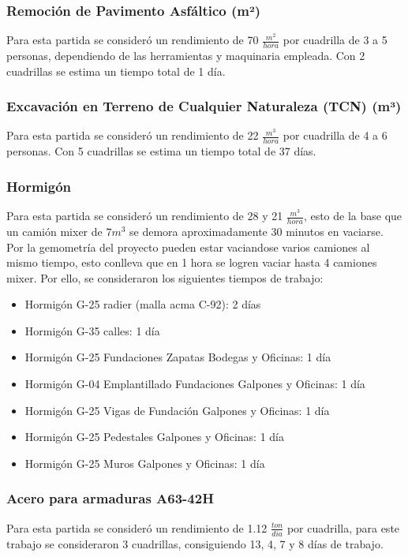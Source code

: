 \documentclass{article} %
\begin{document}
\subsubsection{Remoción de Pavimento Asfáltico (m²)}

Para esta partida se consideró un rendimiento de 70 $\frac{m^2}{hora}$ por cuadrilla de 3 a 5 personas, dependiendo de las herramientas y maquinaria empleada. Con 2 cuadrillas se estima un tiempo total de 1 día.

\subsubsection{Excavación en Terreno de Cualquier Naturaleza (TCN) (m³)}

Para esta partida se consideró un rendimiento de 22 $\frac{m^3}{hora}$ por cuadrilla de 4 a 6 personas. Con 5 cuadrillas se estima un tiempo total de 37 días.

\subsubsection{Hormigón}
Para esta partida se consideró un rendimiento de 28 y 21 $\frac{m^3}{hora}$, esto de la base que un camión mixer de $7m^3$ se demora aproximadamente 30 minutos en vaciarse. Por la gemometría del proyecto pueden estar vaciandose varios camiones al mismo tiempo, esto conlleva que en 1 hora se logren vaciar hasta 4 camiones mixer. Por ello, se consideraron los siguientes tiempos de trabajo:
\begin{itemize}
    \item Hormigón G-25 radier (malla acma C-92): 2 días
    \item Hormigón G-35 calles: 1 día
    \item Hormigón G-25 Fundaciones Zapatas Bodegas y Oficinas: 1 día
    \item Hormigón G-04 Emplantillado Fundaciones Galpones y Oficinas: 1 día
    \item Hormigón G-25 Vigas de Fundación Galpones y Oficinas: 1 día
    \item Hormigón G-25 Pedestales Galpones y Oficinas: 1 día
    \item Hormigón G-25 Muros Galpones y Oficinas: 1 día
\end{itemize}

\subsubsection{Acero para armaduras A63-42H}
Para esta partida se consideró un rendimiento de 1.12 $\frac{ton}{dia}$ por cuadrilla, para este trabajo se consideraron 3 cuadrillas, consiguiendo 13, 4, 7 y 8 días de trabajo.
\end{document}
